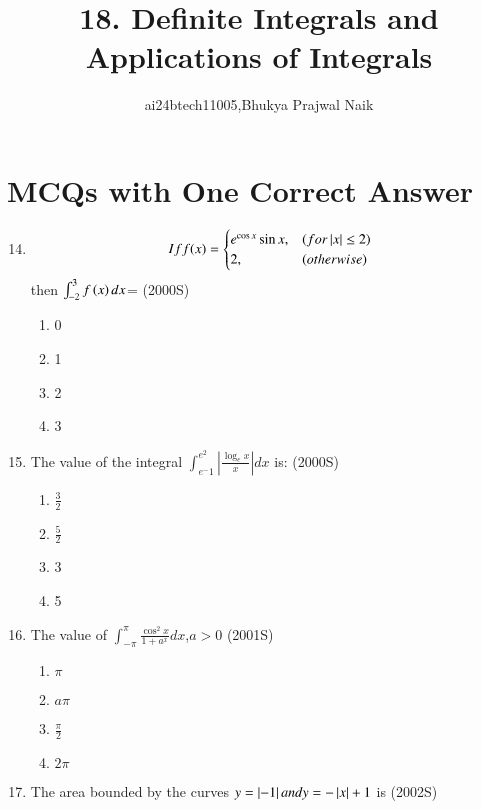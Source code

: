 \documentclass[journal,12pt,twocolumn]{IEEEtran}
\theoremstyle{remark}
\begin{document}

\vspace{3cm}

\title{18. Definite Integrals and Applications of Integrals}
\author{ai24btech11005,Bhukya Prajwal Naik}
\maketitle
\section{MCQs with One Correct Answer}

\begin{enumerate}
\setcounter{enumi}{13}   
\item
\begin{equation}
If f(x) = 
\begin{cases}
	e^{\cos x}\sin x, & \text(for \left\vert x\right\vert \leq 2)\\
 	2, & \text(otherwise)\\
\end{cases}
\end{equation}
then $\int_{-2}^{3}f\left(x\right) dx$=
		\hfill(2000S)
\begin{enumerate}
    \item 0
    \item 1
    \item 2
    \item 3
\end{enumerate}
\item The value of the integral $\int_{e^-1}^{e^2}\left|\frac{\log_e x}{x}\right| dx$ is:
	\hfill(2000S)
\begin{enumerate}
	\item $\frac{3}{2}$
	\item $\frac{5}{2}$
    \item  3
    \item  5
\end{enumerate}
\item The value of $\int_{-\pi}^{\pi}\frac{\cos^2 x}{1+a^ x } dx$,$a>0$
	\hfill(2001S)
\begin{enumerate}
    \item$\pi$
    \item $a\pi$
    \item $\frac{\pi}{2}$
    \item $2\pi$
\end{enumerate}
\item The area bounded by the curves $y=\left\vert-1\right\vert and y=-\left\vert x\right\vert+1$ is
	\hfill(2002S)

\end{enumerate}
\end{document}
